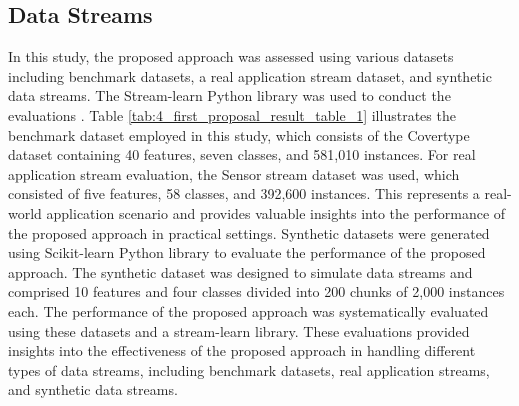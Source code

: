 \subsection{Data Streams}
In this study, the proposed approach was assessed using various datasets including benchmark datasets, a real application stream dataset, and synthetic data streams. The Stream-learn Python library was used to conduct the evaluations \cite{dries2009adaptive}. Table \ref{tab:4_first_proposal_result_table_1} illustrates the benchmark dataset employed in this study, which consists of the Covertype dataset containing 40 features, seven classes, and 581,010 instances. For real application stream evaluation, the Sensor stream dataset was used, which consisted of five features, 58 classes, and 392,600 instances. This represents a real-world application scenario and provides valuable insights into the performance of the proposed approach in practical settings. Synthetic datasets were generated using Scikit-learn Python library to evaluate the performance of the proposed approach. The synthetic dataset was designed to simulate data streams and comprised 10 features and four classes divided into 200 chunks of 2,000 instances each. The performance of the proposed approach was systematically evaluated using these datasets and a stream-learn library. These evaluations provided insights into the effectiveness of the proposed approach in handling different types of data streams, including benchmark datasets, real application streams, and synthetic data streams.

\begin{table}[h!]
  \centering
  \caption{Characteristics of the datasets used in the experiments.}
  \label{tab:4_first_proposal_result_table_1}
  \end{table}

